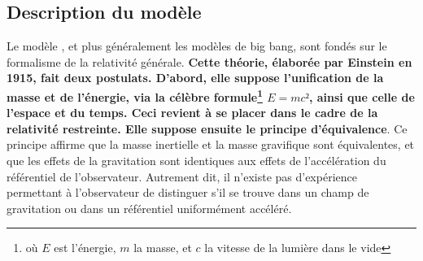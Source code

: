 \documentclass[11pt, twoside, a4paper, openright]{report}
\begin{document}
\subsection{Description du modèle}

Le modèle \lcdm{}, et plus généralement les modèles de big bang, sont fondés sur le formalisme de la relativité générale. \textbf{Cette théorie, élaborée par Einstein en 1915, fait deux postulats. D'abord, elle suppose l'unification de la masse et de l'énergie, via la célèbre formule\footnote{où $E$ est l'énergie, $m$ la masse, et $c$ la vitesse de la lumière dans le vide} $E = mc²$, ainsi que celle de l'espace et du temps. Ceci revient à se placer dans le cadre de la relativité restreinte. Elle suppose ensuite le principe d'équivalence}. Ce principe affirme que la masse inertielle et la masse gravifique sont équivalentes, et que les effets de la gravitation sont identiques aux effets de l'accélération du référentiel de l'observateur. Autrement dit, il n'existe pas d'expérience permettant à l'observateur de distinguer s'il se trouve dans un champ de gravitation ou dans un référentiel uniformément accéléré.
\end{document}
